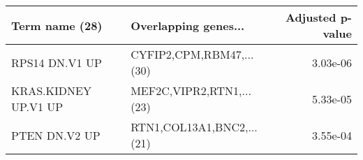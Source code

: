 \begin{tabular}{llr}
\toprule
      Term name (28) &      Overlapping genes... &  Adjusted p-value \\
\midrule
      RPS14 DN.V1 UP &  CYFIP2,CPM,RBM47,...(30) &          3.03e-06 \\
KRAS.KIDNEY UP.V1 UP &  MEF2C,VIPR2,RTN1,...(23) &          5.33e-05 \\
       PTEN DN.V2 UP & RTN1,COL13A1,BNC2,...(21) &          3.55e-04 \\
\bottomrule
\end{tabular}
